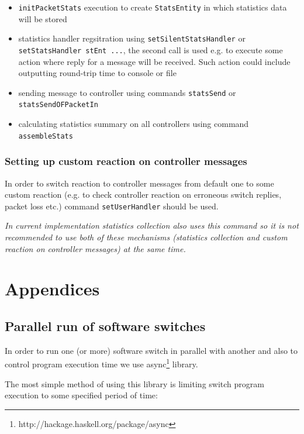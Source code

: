 \documentclass[9pt,a4paper]{article}
\begin{document}
\begin{itemize}
  \item \lstinline!initPacketStats! execution to create
    \lstinline!StatsEntity! in which statistics data will be stored
  \item statistics handler regsitration using
    \lstinline!setSilentStatsHandler!  or \lstinline!setStatsHandler stEnt ...!,
    the second call is used e.g. to execute some action where reply
    for a message will be received. Such action could include
    outputting round-trip time to console or file
  \item sending message to controller using commands
    \lstinline!statsSend! or \lstinline!statsSendOFPacketIn!
  \item calculating statistics summary on all controllers using
    command \lstinline!assembleStats!
\end{itemize}

\subsubsection{Setting up custom reaction on controller messages}

In order to switch reaction to controller messages from default one to
some custom reaction (e.g. to check controller reaction on erroneous
switch replies, packet loss etc.) command \lstinline!setUserHandler!
should be used.

\emph{In current implementation statistics collection also uses this
  command so it is not recommended to use both of these mechanisms
  (statistics collection and custom reaction on controller messages)
  at the same time.}

\section{Appendices}

\subsection{Parallel run of software switches}

In order to run one (or more) software switch in parallel with another
and also to control program execution time we use
async\footnote{http://hackage.haskell.org/package/async} library.

The most simple method of using this library is limiting switch
program execution to some specified period of time:
\end{document}
